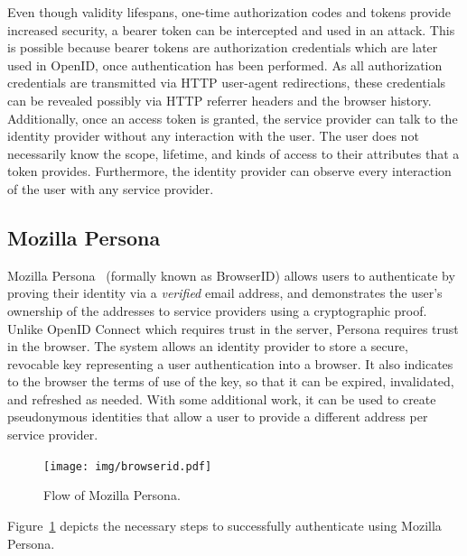 Even though validity lifespans, one-time authorization codes and tokens provide increased security, a bearer token can be intercepted and used in an attack. This is possible because bearer tokens are authorization credentials which are later used in OpenID, once authentication has been performed. As all authorization credentials are transmitted via HTTP user-agent redirections, these credentials can be revealed possibly via HTTP referrer headers and the browser history. Additionally, once an access token is granted, the service provider can talk to the identity provider without any interaction with the user. The user does not necessarily know the scope, lifetime, and kinds of access to their attributes that a token provides. Furthermore, the identity provider can observe every interaction of the user with any service provider.

\subsection{Mozilla Persona}
Mozilla Persona~\cite{browserid} (formally known as BrowserID) allows users to authenticate by proving their identity via a \textit{verified} email address, and demonstrates the user's ownership of the addresses to service providers using a cryptographic proof. Unlike OpenID Connect which requires trust in the server, Persona requires trust in the browser. The system allows an identity provider to store a secure, revocable key representing a user authentication into a browser. It also indicates to the browser the terms of use of the key, so that it can be expired, invalidated, and refreshed as needed. With some additional work, it can be used to create pseudonymous identities that allow a user to provide a different address per service provider.\\

\begin{figure}[htbp]
  \begin{center}
    \texttt{[image: img/browserid.pdf]}
        \caption{Flow of Mozilla Persona.}
        \label{fig:browserid-flow}
  \end{center}
\end{figure}

Figure~\ref{fig:browserid-flow} depicts the necessary steps to successfully authenticate using Mozilla Persona.


